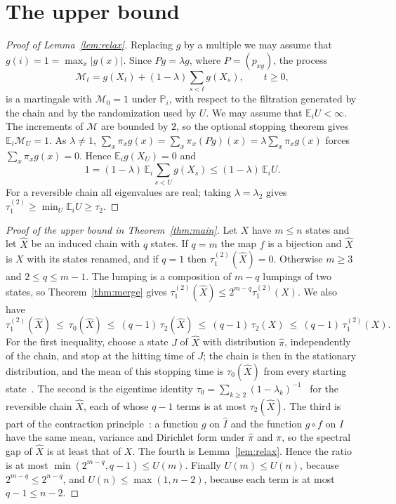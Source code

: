 \documentclass[11pt]{amsart}
\theoremstyle{definition}
\newcommand{\Prob}{\mathbb{P}}
\newcommand{\E}{\mathbb{E}}
\newcommand{\tmix}{\tau_1^{(2)}}
\newcommand{\hpi}{\widehat{\pi}}
\newcommand{\hI}{\widehat{I}}
\newcommand{\hX}{\widehat{X}}
\begin{document}
\section{The upper bound}\label{sec:upper}

\begin{proof}[Proof of Lemma~\ref{lem:relax}]
Replacing $g$ by a multiple we may assume that $g(i)=1=\max_x|g(x)|$. Since $Pg=\lambda g$, where $P=(p_{xy})$, the
process
\[
\mathcal M_t=g(X_t)+(1-\lambda)\sum_{s<t}g(X_s),\qquad t\ge0,
\]
is a martingale with $\mathcal M_0=1$ under $\Prob_i$, with respect to the filtration generated by the chain and by
the randomization used by $U$. We may assume that $\E_iU<\infty$. The increments of $\mathcal M$ are bounded by $2$,
so the optional stopping theorem gives $\E_i\mathcal M_U=1$. As $\lambda\ne1$,
$\sum_x\pi_xg(x)=\sum_x\pi_x(Pg)(x)=\lambda\sum_x\pi_xg(x)$ forces $\sum_x\pi_xg(x)=0$. Hence $\E_ig(X_U)=0$ and
\[
1=(1-\lambda)\,\E_i\sum_{s<U}g(X_s)\le(1-\lambda)\,\E_iU .
\]
For a reversible chain all eigenvalues are real; taking $\lambda=\lambda_2$ gives $\tmix\ge\min_U\E_iU\ge\tau_2$.
\end{proof}

\begin{proof}[Proof of the upper bound in Theorem~\ref{thm:main}]
Let $X$ have $m\le n$ states and let $\hX$ be an induced chain with $q$ states. If $q=m$ the map $f$ is a bijection
and $\hX$ is $X$ with its states renamed, and if $q=1$ then $\tmix(\hX)=0$. Otherwise $m\ge3$ and $2\le q\le m-1$.
The lumping is a composition of $m-q$ lumpings of two states, so Theorem~\ref{thm:merge} gives
$\tmix(\hX)\le2^{m-q}\tmix(X)$. We also have
\begin{equation}\label{eq:chain}
\tmix(\hX)\ \le\ \tau_0(\hX)\ \le\ (q-1)\,\tau_2(\hX)\ \le\ (q-1)\,\tau_2(X)\ \le\ (q-1)\,\tmix(X).
\end{equation}
For the first inequality, choose a state $J$ of $\hX$ with distribution $\hpi$, independently of the chain, and stop
at the hitting time of $J$; the chain is then in the stationary distribution, and the mean of this stopping time is
$\tau_0(\hX)$ from every starting state~\cite[Section~4.3]{AF}. The second is the eigentime identity
$\tau_0=\sum_{k\ge2}(1-\lambda_k)^{-1}$~\cite[Proposition~3.13 and Lemma~4.24]{AF} for the reversible chain $\hX$,
each of whose $q-1$ terms is at most $\tau_2(\hX)$. The third is part of the contraction
principle~\cite[Proposition~4.44]{AF}: a function $g$ on $\hI$ and the function $g\circ f$ on $I$ have the same mean,
variance and Dirichlet form under $\hpi$ and $\pi$, so the spectral gap of $\hX$ is at least that of $X$. The fourth
is Lemma~\ref{lem:relax}. Hence the ratio is at most $\min(2^{m-q},q-1)\le U(m)$. Finally $U(m)\le U(n)$, because
$2^{m-q}\le2^{n-q}$, and $U(n)\le\max(1,n-2)$, because each term is at most $q-1\le n-2$.
\end{proof}
\end{document}
